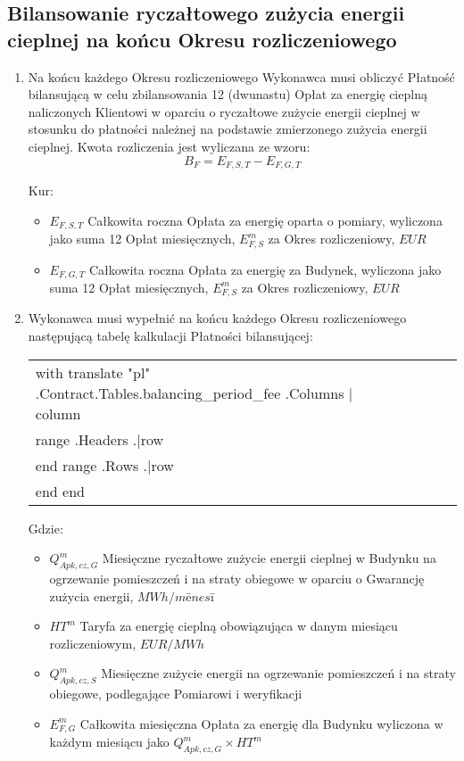 \subsection{Bilansowanie ryczałtowego zużycia energii cieplnej na końcu Okresu rozliczeniowego}
\begin{enumerate}
	\item Na końcu każdego Okresu rozliczeniowego Wykonawca musi obliczyć Płatność bilansującą w celu zbilansowania 12 (dwunastu) Opłat za energię cieplną naliczonych Klientowi w oparciu o ryczałtowe zużycie energii cieplnej w stosunku do płatności należnej na podstawie zmierzonego zużycia energii cieplnej. Kwota rozliczenia jest wyliczana ze wzoru:
\[ B_F = E_{F,S,T} - E_{F,G,T} \]

Kur:

\begin{itemize}
	\item $E_{F,S,T}$ Całkowita roczna Opłata za energię oparta o pomiary, wyliczona jako suma 12 Opłat miesięcznych, $E^{m}_{F,S}$ za Okres rozliczeniowy, $EUR$
	\item $E_{F,G,T}$ Całkowita roczna Opłata za energię za Budynek, wyliczona jako suma 12 Opłat miesięcznych, $E^{m}_{F,S}$ za Okres rozliczeniowy, $EUR$
\end{itemize}

	\item Wykonawca musi wypełnić na końcu każdego Okresu rozliczeniowego następującą tabelę kalkulacji Płatności bilansującej:


\begin{center}
\begin{tabu}{|X|X|X|X|X|X|X|} \tabucline{}
{{with translate "pl" .Contract.Tables.balancing_period_fee}} %
	{{.Columns | column}} \\\tabucline{}
	{{range .Headers}} {{.|row}} \\\tabucline{} {{end}} %
	{{range .Rows}} {{.|row}} \\\tabucline{} {{end}} %
{{end}}
\end{tabu}
\end{center}

Gdzie:

\begin{itemize}
	\item $Q^{m}_{Apk,cz,G}$ Miesięczne ryczałtowe zużycie energii cieplnej w Budynku na ogrzewanie pomieszczeń i na straty obiegowe w oparciu o Gwarancję zużycia energii, $MWh/mēnesī$
	\item $HT^m$ Taryfa za energię cieplną obowiązująca w danym miesiącu rozliczeniowym, $EUR/MWh$
	\item $Q^m_{Apk,cz,S}$ Miesięczne zużycie energii na ogrzewanie pomieszczeń i na straty obiegowe, podlegające Pomiarowi i weryfikacji
	\item $E^m_{F,G}$ Całkowita miesięczna Opłata za energię dla Budynku wyliczona w każdym miesiącu jako $Q^{m}_{Apk,cz,G} \times HT^{m}$
\end{itemize}


\end{enumerate}
